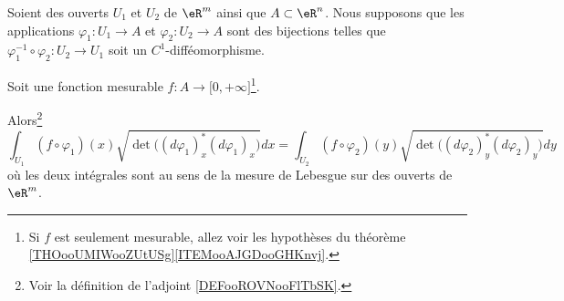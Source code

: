 \begin{proposition}     \label{PROPooOAHWooAfxvyv}
    Soient des ouverts \( U_1\) et \( U_2\) de \( \eR^m\) ainsi que \( A\subset \eR^n\). Nous supposons que les applications \( \varphi_1\colon U_1\to A\) et \( \varphi_2\colon U_2\to A\) sont des bijections telles que \( \varphi_1^{-1}\circ \varphi_2\colon U_2\to U_1\) soit un \( C^1\)-difféomorphisme. 
        
    Soit une fonction mesurable \( f\colon A\to \mathopen[ 0 , +\infty \mathclose]\)\footnote{Si \( f\) est seulement mesurable, allez voir les hypothèses du théorème \ref{THOooUMIWooZUtUSg}\ref{ITEMooAJGDooGHKnvj}.}.

    Alors\footnote{Voir la définition de l'adjoint \ref{DEFooROVNooFlTbSK}.}
    \begin{equation}
        \int_{U_1}(f\circ \varphi_1)(x)\sqrt{ \det\big( (d\varphi_1)_x^*(d\varphi_1)_x \big) }dx=
        \int_{U_2}(f\circ \varphi_2)(y)\sqrt{ \det\big( (d\varphi_2)_y^*(d\varphi_2)_y \big) }dy
    \end{equation}
    où les deux intégrales sont au sens de la mesure de Lebesgue sur des ouverts de \( \eR^m\).
\end{proposition}

